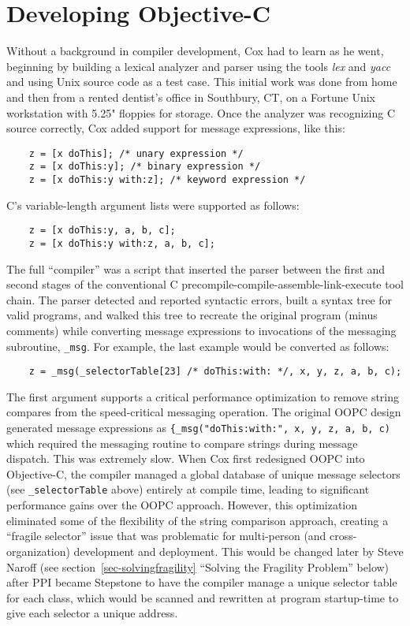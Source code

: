 \documentclass[acmsmall]{acmart}\settopmatter{}
\begin{document}
\section{Developing Objective-C}
\label{sec-devObjC}
Without a background in compiler development, Cox had to learn as he went, beginning by building a lexical analyzer and parser using the tools \textit{lex} and \textit{yacc} and using Unix source code as a test case. This initial work was done from home and then from a rented dentist's office in Southbury, CT, on a Fortune Unix workstation with 5.25" floppies for storage. Once the analyzer was recognizing C source correctly, Cox added support for message expressions, like this:
\begin{verbatim}
    z = [x doThis]; /* unary expression */
    z = [x doThis:y]; /* binary expression */
    z = [x doThis:y with:z]; /* keyword expression */
\end{verbatim}
C's variable-length argument lists were supported as follows:
\begin{verbatim}
    z = [x doThis:y, a, b, c]; 
    z = [x doThis:y with:z, a, b, c];
\end{verbatim}
The full ``compiler'' was a script that inserted the parser between the first and second stages of the conventional C precompile-compile-assemble-link-execute tool chain. The parser detected and reported syntactic errors, built a syntax tree for valid programs, and walked this tree to recreate the original program (minus comments) while converting message expressions to invocations of the messaging subroutine, \verb|_msg|. For example, the last example would be converted as follows:
\begin{verbatim}
    z = _msg(_selectorTable[23] /* doThis:with: */, x, y, z, a, b, c);
\end{verbatim}
The first argument supports a critical performance optimization to remove string compares from the speed-critical messaging operation. The original OOPC design generated message expressions as {\small \verb|{_msg("doThis:with:", x, y, z, a, b, c)|} which required the messaging routine to compare strings during message dispatch. This was extremely slow. When Cox first redesigned OOPC into Objective-C, the compiler managed a global database of unique message selectors (see {\small \verb|_selectorTable|} above) entirely at compile time, leading to significant performance gains over the OOPC approach. However, this optimization eliminated some of the flexibility of the string comparison approach, creating a ``fragile selector'' issue that was problematic for multi-person (and cross-organization) development and deployment. This would be changed later by Steve Naroff (see section~\ref{sec-solvingfragility} ``Solving the Fragility Problem'' below) after PPI became Stepstone to have the compiler manage a unique selector table for each class, which would be scanned and rewritten at program startup-time to give each selector a unique address.
\end{document}

